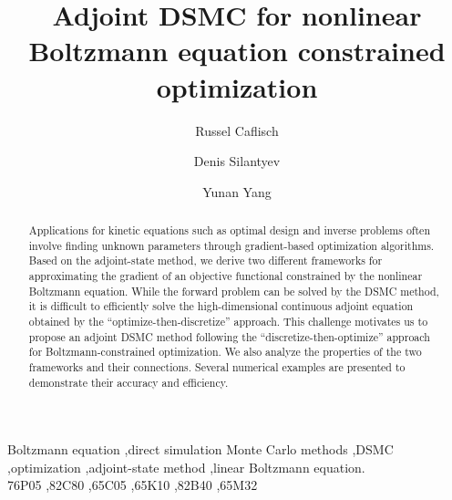 \documentclass[times,final,nopreprintline]{elsarticle}
\begin{document}
\begin{frontmatter}


\title{Adjoint DSMC for nonlinear Boltzmann equation constrained optimization}


\author[address1]{Russel  Caflisch}
\address[address1]{Courant Institute of Mathematical Sciences, New York University, New York, NY 10012.}
\author[address1]{Denis Silantyev}
\author[address1]{Yunan Yang}


\begin{abstract}
Applications for kinetic equations such as optimal design and inverse problems often involve finding unknown parameters through gradient-based optimization algorithms. Based on the adjoint-state method, we derive two different frameworks for approximating the gradient of an objective functional constrained by the nonlinear Boltzmann equation. While the forward problem can be solved by the DSMC method, it is difficult to efficiently solve the high-dimensional continuous adjoint equation obtained by the ``optimize-then-discretize'' approach. This challenge motivates us to propose an adjoint DSMC method following the ``discretize-then-optimize'' approach for Boltzmann-constrained optimization. We also analyze the properties of the two frameworks and their connections. Several numerical examples are presented to demonstrate their accuracy and efficiency.
\end{abstract}

\begin{keyword}
Boltzmann equation \sep direct simulation Monte Carlo methods \sep DSMC \sep optimization \sep adjoint-state method \sep linear Boltzmann equation.\\

\MSC 76P05 \sep  82C80 \sep 65C05 \sep  65K10 \sep 82B40 \sep 65M32
\end{keyword}




\end{frontmatter}





\end{document}
